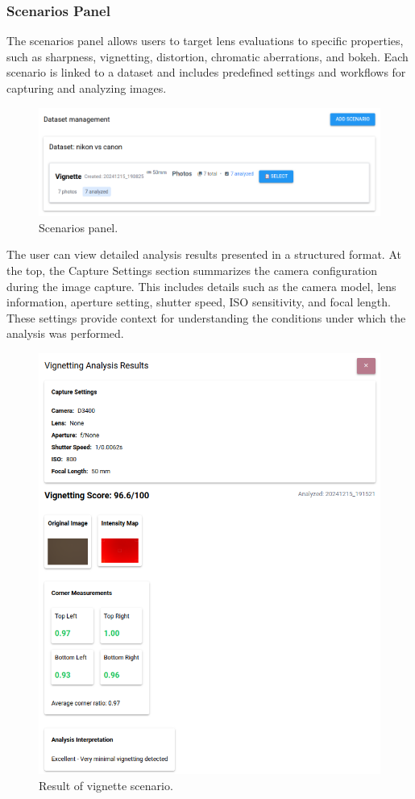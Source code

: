 \subsubsection{Scenarios Panel} %
The scenarios panel allows users to target lens evaluations to specific properties, such as sharpness, vignetting, distortion, chromatic aberrations, and bokeh. Each scenario is linked to a dataset and includes predefined settings and workflows for capturing and analyzing images.

\begin{figure}[hbt]
\centering
\includegraphics[width=1\textwidth]{Images/scenarios_panel.png}
\caption{Scenarios panel.}
\label{fig:ui_scenarios}
\end{figure}

The user can view detailed analysis results presented in a structured format. At the top, the Capture Settings section summarizes the camera configuration during the image capture. This includes details such as the camera model, lens information, aperture setting, shutter speed, ISO sensitivity, and focal length. These settings provide context for understanding the conditions under which the analysis was performed.

\begin{figure}[hbt]
\centering
\includegraphics[height=0.8\textwidth]{Images/scenario_result.png}
\caption{Result of vignette scenario.}
\label{fig:ui_scenario_result}
\end{figure}


